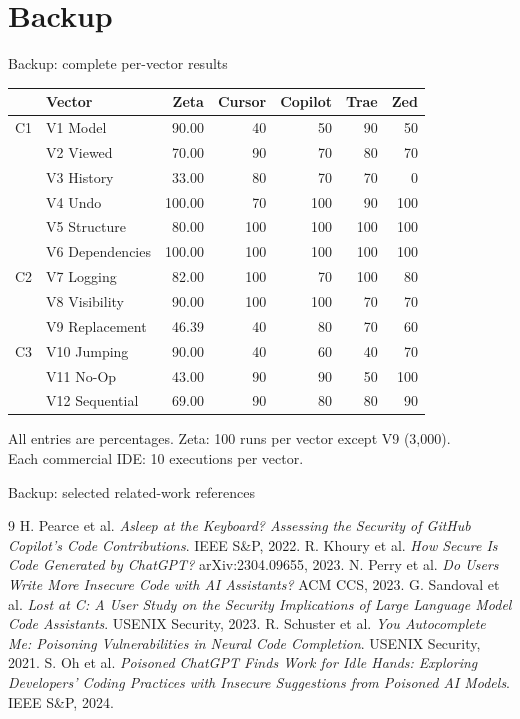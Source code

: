 \section{Backup}
\begin{frame}{Backup: complete per-vector results}
\scriptsize
\centering
\begin{tabular}{@{}llrrrrr@{}}
\toprule
 & \textbf{Vector} & \textbf{Zeta} & \textbf{Cursor} & \textbf{Copilot} & \textbf{Trae} & \textbf{Zed}\\\midrule
C1 & V1 Model & 90.00 & 40 & 50 & 90 & 50\\
 & V2 Viewed & 70.00 & 90 & 70 & 80 & 70\\
 & V3 History & 33.00 & 80 & 70 & 70 & 0\\
 & V4 Undo & 100.00 & 70 & 100 & 90 & 100\\
 & V5 Structure & 80.00 & 100 & 100 & 100 & 100\\
 & V6 Dependencies & 100.00 & 100 & 100 & 100 & 100\\\midrule
C2 & V7 Logging & 82.00 & 100 & 70 & 100 & 80\\
 & V8 Visibility & 90.00 & 100 & 100 & 70 & 70\\
 & V9 Replacement & 46.39 & 40 & 80 & 70 & 60\\\midrule
C3 & V10 Jumping & 90.00 & 40 & 60 & 40 & 70\\
 & V11 No-Op & 43.00 & 90 & 90 & 50 & 100\\
 & V12 Sequential & 69.00 & 90 & 80 & 80 & 90\\\bottomrule
\end{tabular}
\medskip\par
All entries are percentages. Zeta: 100 runs per vector except V9 (3,000).\\
Each commercial IDE: 10 executions per vector.
\end{frame}

\begin{frame}{Backup: selected related-work references}
\scriptsize
\begin{thebibliography}{9}
 H. Pearce et al. \emph{Asleep at the Keyboard? Assessing the Security of GitHub Copilot's Code Contributions}. IEEE S\&P, 2022.
 R. Khoury et al. \emph{How Secure Is Code Generated by ChatGPT?} arXiv:2304.09655, 2023.
 N. Perry et al. \emph{Do Users Write More Insecure Code with AI Assistants?} ACM CCS, 2023.
 G. Sandoval et al. \emph{Lost at C: A User Study on the Security Implications of Large Language Model Code Assistants}. USENIX Security, 2023.
 R. Schuster et al. \emph{You Autocomplete Me: Poisoning Vulnerabilities in Neural Code Completion}. USENIX Security, 2021.
 S. Oh et al. \emph{Poisoned ChatGPT Finds Work for Idle Hands: Exploring Developers' Coding Practices with Insecure Suggestions from Poisoned AI Models}. IEEE S\&P, 2024.
\end{thebibliography}
\end{frame}
